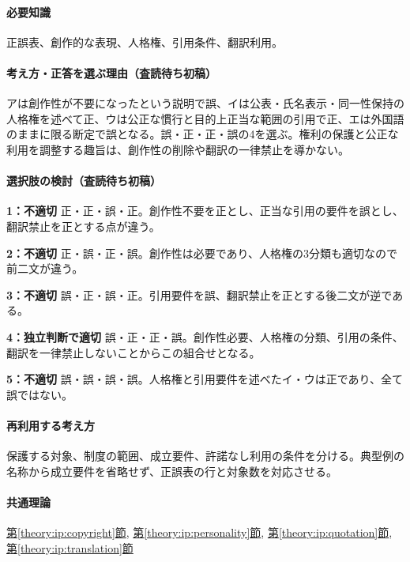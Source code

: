 \paragraph{必要知識} 正誤表、創作的な表現、人格権、引用条件、翻訳利用。

\paragraph{考え方・正答を選ぶ理由（査読待ち初稿）} アは創作性が不要になったという説明で誤、イは公表・氏名表示・同一性保持の人格権を述べて正、ウは公正な慣行と目的上正当な範囲の引用で正、エは外国語のままに限る断定で誤となる。誤・正・正・誤の4を選ぶ。権利の保護と公正な利用を調整する趣旨は、創作性の削除や翻訳の一律禁止を導かない。

\paragraph{選択肢の検討（査読待ち初稿）}\mbox{}\par

\noindent\textbf{1：不適切} 正・正・誤・正。創作性不要を正とし、正当な引用の要件を誤とし、翻訳禁止を正とする点が違う。\par

\noindent\textbf{2：不適切} 正・誤・正・誤。創作性は必要であり、人格権の3分類も適切なので前二文が違う。\par

\noindent\textbf{3：不適切} 誤・正・誤・正。引用要件を誤、翻訳禁止を正とする後二文が逆である。\par

\noindent\textbf{4：独立判断で適切} 誤・正・正・誤。創作性必要、人格権の分類、引用の条件、翻訳を一律禁止しないことからこの組合せとなる。\par

\noindent\textbf{5：不適切} 誤・誤・誤・誤。人格権と引用要件を述べたイ・ウは正であり、全て誤ではない。\par

\paragraph{再利用する考え方} 保護する対象、制度の範囲、成立要件、許諾なし利用の条件を分ける。典型例の名称から成立要件を省略せず、正誤表の行と対象数を対応させる。

\paragraph{共通理論} \hyperref[theory:ip:copyright]{第\ref*{theory:ip:copyright}節}, \hyperref[theory:ip:personality]{第\ref*{theory:ip:personality}節}, \hyperref[theory:ip:quotation]{第\ref*{theory:ip:quotation}節}, \hyperref[theory:ip:translation]{第\ref*{theory:ip:translation}節}

